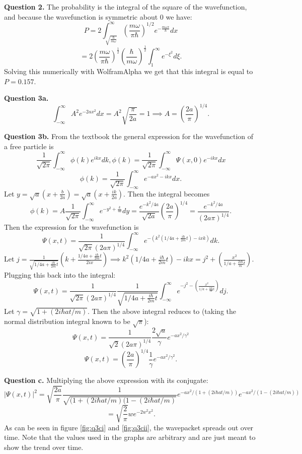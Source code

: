 \documentclass[letterpaper, reqno,11pt]{article}
\begin{document}
{\noindent\bf Question 2.} The probability is the integral of the square of the wavefunction, and because the wavefunction is symmetric about $0$ we have: 
\[
P=2\int_{\sqrt{\frac{\hbar}{m\omega}}}^\infty \left( \frac{m\omega}{\pi\hbar} \right)^{1 /2}e^{-\frac{m\omega x}{\hbar}}dx
\]
\[
=2\left( \frac{m\omega}{\pi\hbar} \right)^{\frac{1}{2}}\left( \frac{\hbar}{m\omega} \right)^{\frac{1}{2}}  \int_{1}^{\infty}e^{-\xi^2}d\xi
.\]
Solving this numerically with WolframAlpha we get that this integral is equal to $P=0.157$. 

{\noindent\bf Question 3a.} 
\[
\int_{-\infty}^{\infty}A^2e^{-2ax^2}dx=A^2 \sqrt{\frac{\pi}{2a}}=1\implies A=\left( \frac{2a}{\pi} \right)^{1 /4}
.\]

{\noindent\bf Question 3b.} From the textbook the general expression for the wavefunction of a free particle is 
\[
\frac{1}{\sqrt{2\pi} }\int_{-\infty}^{\infty}\phi(k)e^{ikx}dk, \phi(k)=\frac{1}{\sqrt{2\pi} }\int_{-\infty}^{\infty}\Psi(x, 0)e^{-ikx}dx
\]
\[
\phi(k)=\frac{1}{\sqrt{2\pi} }\int_{-\infty}^{\infty}e^{-ax^2-ikx}dx
.\]
Let $y=\sqrt{a} (x+\frac{b}{2a})=\sqrt{a} (x+\frac{ik}{2a})$. Then the integral becomes 
\[
\phi(k)=A\frac{1}{\sqrt{2\pi} }\int_{-\infty}^{\infty}e^{-y^2+\frac{k}{4a}}dy=\frac{e^{-k^2 /4a}}{\sqrt{2a} }\left( \frac{2a}{\pi} \right)^{1 /4}=\frac{e^{-k^2 /4a}}{(2a\pi)^{1 /4} }
.\]
Then the expression for the wavefunction is 
\[
\Psi(x, t)=\frac{1}{\sqrt{ 2\pi}(2a\pi)^{1 /4} }\int_{-\infty}^{\infty}e^{-\left(k^2 \left(1/4a+\frac{i\hbar}{2m}t\right)-ixk\right)}dk
.\]
Let $j=\frac{1}{\sqrt{1/4a+\frac{i\hbar}{2m}t}}\left( k+\frac{1/4a+\frac{i\hbar}{2m}t}{2ix} \right)\implies k^2\left( 1/4a+\frac{i\hbar}{2m}t \right) -ikx=j^2+\left( \frac{x^2}{1 /a+\frac{2i\hbar}{m}t} \right) $. Plugging this back into the integral: 
\[
\Psi(x, t)=\frac{1}{\sqrt{ 2\pi}(2a\pi)^{1 /4} }\frac{1}{\sqrt{1/4a+\frac{i\hbar}{2m}t}}\int_{-\infty}^{\infty}e^{-j^2-\left( \frac{x^2}{1 /a+\frac{2i\hbar}{m}t} \right)}dj
.\]
Let $\gamma=\sqrt{1+(2i\hbar at /m)} $. Then the above integral reduces to (taking the normal distribution integral known to be $ \sqrt{\pi} $): 
\[
\Psi(x, t)=\frac{1}{\sqrt{ 2}(2a\pi)^{1 /4} }\frac{2\sqrt{a}}{\gamma}e^{-ax^2 /\gamma^2}
\]
\[
\Psi(x, t)=\left(\frac{2a}{\pi}\right)^{1 /4}\frac{1}{\gamma}e^{-ax^2 /\gamma^2}
.\]

{\noindent\bf Question c.} Multiplying the above expression with its conjugate: 
\[
|\Psi(x, t)|^2=\sqrt{\frac{2a}{\pi}}\frac{1}{\sqrt{(1+(2i\hbar at /m)(1-(2i\hbar at /m)} }e^{-ax^2 /(1+(2i\hbar at /m))}e^{-ax^2 /(1-(2i\hbar at /m)) }
\]
\[
=\sqrt{\frac{2}{\pi}}we^{-2w^2x^2} 
.\]
As can be seen in figure \ref{fig:q3ci} and \ref{fig:q3cii}, the wavepacket spreads out over time. Note that the values used in the graphs are arbitrary and are just meant to show the trend over time. 
\end{document}
